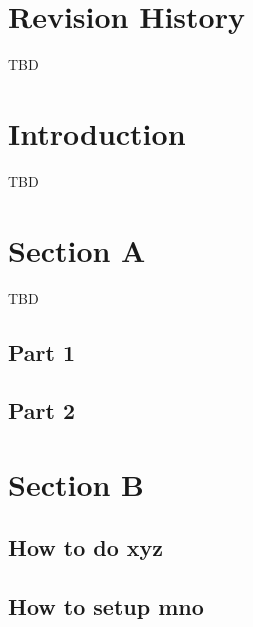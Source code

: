 \documentclass[letterpaper,10pt,english]{sphinxmanual}
\begin{document}
\chapter{Revision History}
\label{\detokenize{user-guide:revision-history}}
TBD


\chapter{Introduction}
\label{\detokenize{user-guide:introduction}}
TBD


\chapter{Section A}
\label{\detokenize{user-guide:section-a}}
TBD


\section{Part 1}
\label{\detokenize{user-guide:part-1}}

\section{Part 2}
\label{\detokenize{user-guide:part-2}}

\chapter{Section B}
\label{\detokenize{user-guide:section-b}}

\section{How to do xyz}
\label{\detokenize{user-guide:how-to-do-xyz}}

\section{How to setup mno}
\label{\detokenize{user-guide:how-to-setup-mno}}


\renewcommand{\indexname}{Index}
\printindex
\end{document}

